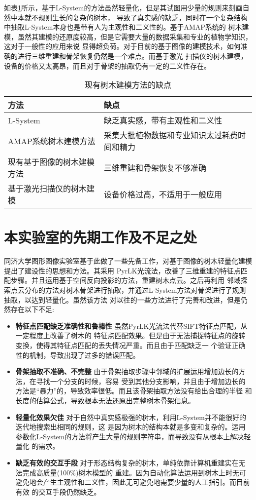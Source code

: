 如表\ref{tab:short}所示，基于L-System的方法虽然轻量化，但是其试图用少量的规则来刻画自然中本就不规则生长的复杂的树木，
导致了真实感的缺乏，同时在一个复杂结构中抽取L-System本身也是带有人为主观性和二义性的。基于AMAP系统的
树木建模，虽然其建模的还原度较高，但是它需要大量的数据采集和专业的植物学知识，这对于一般性的应用来说
显得超负荷。对于目前的基于图像的建模技术，如何准确的进行三维重建和骨架恢复仍然是一个难点。而基于激光
扫描仪的树木建模，设备的价格又太高昂，而且对于骨架的抽取仍有一定的二义性存在。
\begin{table}[H]
	\centering
	\caption{现有树木建模方法的缺点}
	\label{tab:short}
	\begin{tabular}{|l|l|}
		\hline
		方法 & 缺点\\
		\hline
		L-System & 缺乏真实感，带有主观性和二义性\\
		\hline
		AMAP系统树木建模方法 & 采集大批植物数据和专业知识太过耗费时间和精力\\
		\hline
		现有基于图像的树木建模方法 & 三维重建和骨架恢复不够准确\\
		\hline
		基于激光扫描仪的树木建模 & 设备价格过高，不适用于一般应用\\
		\hline
	\end{tabular}
\end{table}

\section{本实验室的先期工作及不足之处}

同济大学图形图像实验室基于此做了一些先备工作\cite{WengHao,ZhangChen,SunRuoXi}，对基于图像的树木轻量化建模提出了建设性的思想和方法。其采用
PyrLK光流法，改善了三维重建的特征点匹配步骤。并且运用基于空间反向投影的方法，重建树木点云。之后再利用
邻域探索点云分布的方法对树木骨架进行抽取，并通过L-System方法对骨架进行了规则抽取，以达到轻量化。虽然该方法
对以往的一些方法进行了完善和改进，但是仍然存在以下不足:\\
\begin{itemize}
	\item \textbf{特征点匹配缺乏准确性和鲁棒性} 虽然PyrLK光流法代替SIFT特征点匹配，从一定程度上改善了树木的
		特征点匹配效果。但是由于无法捕捉特征点的旋转变换，使得其特征点匹配的丢失情况严重。而且由于匹配缺乏一
		个验证正确性的机制，导致出现了过多的错误匹配。
	\item \textbf{骨架抽取不准确、不完整} 由于骨架抽取步骤中邻域的扩展运用增加边长的方法，在寻找一个分支的时候，容易
		受到其他分支影响，并且由于增加边长的方法是“暴力”的，导致效率很低。而且该骨架抽取方法没有给出合理的半径
		和长度的估算公式，导致根本无法还原出完整树木骨架信息。
	\item \textbf{轻量化效果欠佳} 对于自然中真实感极强的树木，利用L-System并不能很好的迭代地搜索出相同的规则，这
		是因为树木的结构本就是多变和复杂的。运用参数化L-System的方法将产生大量的规则字符串，而导致没有从根本上解决轻量化
		的需求。
	\item \textbf{缺乏有效的交互手段} 对于形态结构复杂的树木，单纯依靠计算机重建实在无法完成高质量(100\%)树木模型的
		重建。因为自动化算法运用到树木上时无可避免地会产生主观性和二义性，因此无可避免地需要少量的人工指引。而目前有效
		的交互手段仍然缺乏。
\end{itemize}


